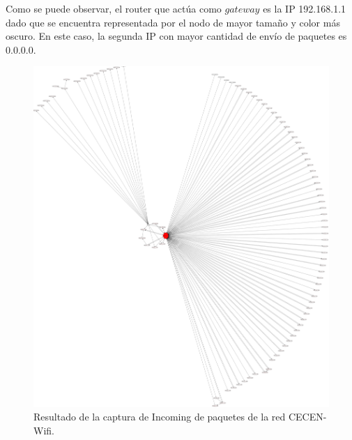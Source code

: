 \documentclass[10pt, a4paper]{article}
\begin{document}
Como se puede observar, el router que actúa como $gateway$ es la IP 192.168.1.1 dado que se encuentra representada por el nodo de mayor tamaño y color más oscuro. En este caso, la segunda IP con mayor cantidad de envío de paquetes es 0.0.0.0.


\begin{figure}[H] %
\begin{center}
\includegraphics[width=450pt]{../imgs/cecen-incoming.png}
\caption{Resultado de la captura de Incoming de paquetes de la red CECEN-Wifi.}
\end{center}
\end{figure}
\end{document}
